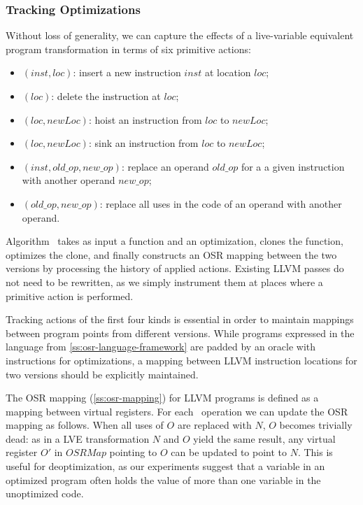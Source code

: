 \subsubsection*{Tracking Optimizations}
Without loss of generality, we can capture the effects of a live-variable equivalent program transformation in terms of six primitive actions:
\begin{itemize}[parsep=0pt,partopsep=0pt]
 \item {}$(inst, loc)$: insert a new instruction $inst$ at location $loc$;
 \item {}$(loc)$: delete the instruction at $loc$;
 \item {}$(loc, newLoc)$: hoist an instruction from $loc$ to $newLoc$;
 \item {}$(loc, newLoc)$: sink an instruction from $loc$ to $newLoc$;
 \item {}$(inst, old\_op, new\_op)$: replace an operand $old\_op$ for a a given instruction with another operand $new\_op$;
 \item {}$(old\_op, new\_op)$: replace all uses in the code of an operand with another operand.
\end{itemize}

\noindent Algorithm \apply\ takes as input a function and an optimization, clones the function, optimizes the clone, and finally constructs an OSR mapping between the two versions by processing the history of applied actions. Existing LLVM passes do not need to be rewritten, as we simply instrument them at places where a primitive action is performed.

Tracking actions of the first four kinds is essential in order to maintain mappings between program points from different versions.
While programs expressed in the language from \mysection\ref{ss:osr-language-framework} are padded by an oracle with  instructions for optimizations, a mapping between LLVM instruction locations for two versions should be explicitly maintained.

The OSR mapping (\mysection\ref{ss:osr-mapping}) for LLVM programs is defined as a mapping between virtual registers. For each \RAUWfull\ operation we can update the OSR mapping as follows. When all uses of $O$ are replaced with $N$, $O$ becomes trivially dead: as in a LVE transformation $N$ and $O$ yield the same result, any virtual register $O'$ in $OSRMap$ pointing to $O$ can be updated to point to $N$. This is useful for deoptimization, as our experiments suggest that a variable in an optimized program often holds the value of more than one variable in the unoptimized code.

